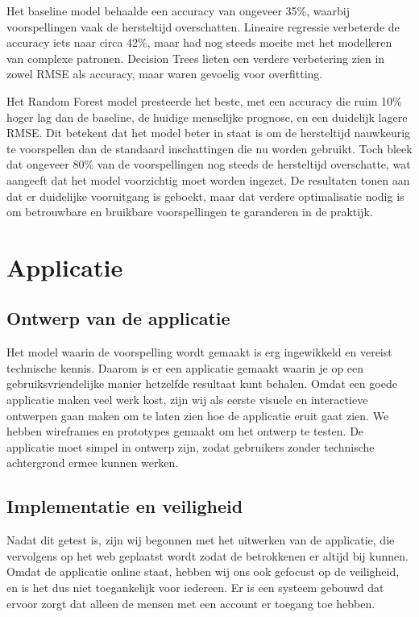 \documentclass{article}
\begin{document}
Het baseline model behaalde een accuracy van ongeveer 35\%, waarbij voorspellingen vaak de hersteltijd overschatten. Lineaire regressie verbeterde de accuracy iets naar circa 42\%, maar had nog steeds moeite met het modelleren van complexe patronen. Decision Trees lieten een verdere verbetering zien in zowel RMSE als accuracy, maar waren gevoelig voor overfitting.

Het Random Forest model presteerde het beste, met een accuracy die ruim 10\% hoger lag dan de baseline, de huidige menselijke prognose, en een duidelijk lagere RMSE. Dit betekent dat het model beter in staat is om de hersteltijd nauwkeurig te voorspellen dan de standaard inschattingen die nu worden gebruikt. Toch bleek dat ongeveer 80\% van de voorspellingen nog steeds de hersteltijd overschatte, wat aangeeft dat het model voorzichtig moet worden ingezet. De resultaten tonen aan dat er duidelijke vooruitgang is geboekt, maar dat verdere optimalisatie nodig is om betrouwbare en bruikbare voorspellingen te garanderen in de praktijk.

\newpage
\section{Applicatie}

\subsection{Ontwerp van de applicatie}
Het model waarin de voorspelling wordt gemaakt is erg ingewikkeld en vereist technische kennis. Daarom is er een applicatie gemaakt waarin je op een gebruiksvriendelijke manier hetzelfde resultaat kunt behalen. Omdat een goede applicatie maken veel werk kost, zijn wij als eerste visuele en interactieve ontwerpen gaan maken om te laten zien hoe de applicatie eruit gaat zien. We hebben wireframes en prototypes gemaakt om het ontwerp te testen. De applicatie moet simpel in ontwerp zijn, zodat gebruikers zonder technische achtergrond ermee kunnen werken.

\subsection{Implementatie en veiligheid}
Nadat dit getest is, zijn wij begonnen met het uitwerken van de applicatie, die vervolgens op het web geplaatst wordt zodat de betrokkenen er altijd bij kunnen. Omdat de applicatie online staat, hebben wij ons ook gefocust op de veiligheid, en is het dus niet toegankelijk voor iedereen. Er is een systeem gebouwd dat ervoor zorgt dat alleen de mensen met een account er toegang toe hebben.
\end{document}
